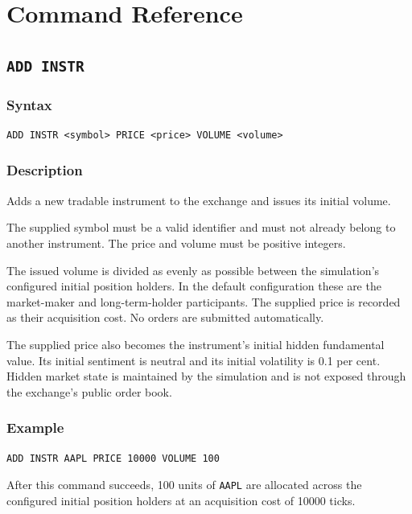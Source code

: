 \documentclass{article}
\begin{document}
\section{Command Reference}

\subsection{\texttt{ADD INSTR}}

\subsubsection*{Syntax}

\begin{lstlisting}
ADD INSTR <symbol> PRICE <price> VOLUME <volume>
\end{lstlisting}

\subsubsection*{Description}

Adds a new tradable instrument to the exchange and issues its initial volume.

The supplied symbol must be a valid identifier and must not already
belong to another instrument. The price and volume must be positive integers.

The issued volume is divided as evenly as possible between the simulation's
configured initial position holders. In the default configuration these are
the market-maker and long-term-holder participants. The supplied price is
recorded as their acquisition cost. No orders are submitted automatically.

The supplied price also becomes the instrument's initial hidden fundamental
value. Its initial sentiment is neutral and its initial volatility is 0.1 per
cent. Hidden market state is maintained by the simulation and is not exposed
through the exchange's public order book.

\subsubsection*{Example}

\begin{lstlisting}
ADD INSTR AAPL PRICE 10000 VOLUME 100
\end{lstlisting}

After this command succeeds, 100 units of \texttt{AAPL} are allocated across
the configured initial position holders at an acquisition cost of 10000 ticks.
\end{document}
